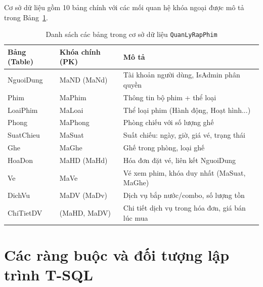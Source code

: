 \documentclass[12pt,a4paper,oneside]{book}
\theoremstyle{plain}
\numberwithin{equation}{chapter}
\begin{document}
\vspace{0.5cm}

\noindent Cơ sở dữ liệu gồm 10 bảng chính với các mối quan hệ khóa ngoại được mô tả trong Bảng~\ref{table_db}.

\begin{table}[H]
    \begin{center}
        \begin{tabular}{|l|l|l|}
            \hline
            \textbf{Bảng (Table)} & \textbf{Khóa chính (PK)} & \textbf{Mô tả} \\
            \hline
            NguoiDung   & MaND (MaNd)  & Tài khoản người dùng, IsAdmin phân quyền \\
            \hline
            Phim        & MaPhim       & Thông tin bộ phim + thể loại \\
            \hline
            LoaiPhim    & MaLoai       & Thể loại phim (Hành động, Hoạt hình...) \\
            \hline
            Phong       & MaPhong      & Phòng chiếu với số lượng ghế \\
            \hline
            SuatChieu   & MaSuat       & Suất chiếu: ngày, giờ, giá vé, trạng thái \\
            \hline
            Ghe         & MaGhe        & Ghế trong phòng, loại ghế \\
            \hline
            HoaDon      & MaHD (MaHd)  & Hóa đơn đặt vé, liên kết NguoiDung \\
            \hline
            Ve          & MaVe         & Vé xem phim, khóa duy nhất (MaSuat, MaGhe) \\
            \hline
            DichVu      & MaDV (MaDv)  & Dịch vụ bắp nước/combo, số lượng tồn \\
            \hline
            ChiTietDV   & (MaHD, MaDV) & Chi tiết dịch vụ trong hóa đơn, giá bán lúc mua \\
            \hline
        \end{tabular}
    \end{center}
    \caption{Danh sách các bảng trong cơ sở dữ liệu \texttt{QuanLyRapPhim}}\label{table_db}
\end{table}

\section{Các ràng buộc và đối tượng lập trình T-SQL}\label{Sec2.2}
\end{document}
